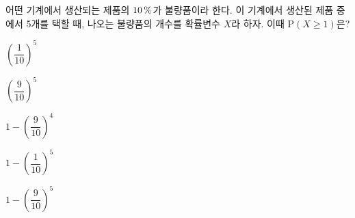 어떤 기계에서 생산되는 제품의 $10\mkern3mu \%$가 불량품이라 한다. 이 기계에서 생산된 제품 중에서 5개를 택할 때, 나오는 불량품의 개수를 확률변수 $X$라 하자. 이때 $\mathrm{P}(X\ge 1)$은?
\begin{choices32}{\rule[-3ex]{0pt}{8ex}$\left(\dfrac{1}{10}\right)^{5}$}{\rule[-3ex]{0pt}{8ex}$\left(\dfrac{9}{10}\right)^{5}$}{\rule[-3ex]{0pt}{8ex}$1-\left(\dfrac{9}{10}\right)^{4}$}{\rule[-3ex]{0pt}{8ex}$1-\left(\dfrac{1}{10}\right)^{5}$}{\rule[-3ex]{0pt}{8ex}$1-\left(\dfrac{9}{10}\right)^{5}$}\end{choices32}
